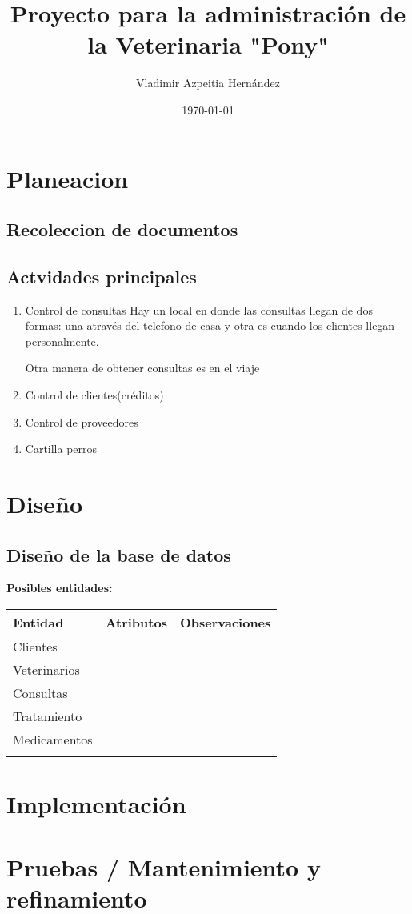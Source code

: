 \documentclass[11pt]{article}
\author{Vladimir Azpeitia Hernández}
\date{\today}
\title{Proyecto para la administración de la Veterinaria "Pony"}
\begin{document}
\maketitle
\section{Planeacion}
\label{sec:orgf28371c}
\subsection{Recoleccion de documentos}
\label{sec:orgb1537d7}
\subsection{Actvidades principales}
\label{sec:org1c1d314}
\begin{enumerate}
\item Control de consultas
Hay un local en donde las consultas llegan de dos formas: una através del telefono de casa y otra es cuando los
clientes llegan personalmente.

Otra manera de obtener consultas es en el viaje
\item Control de clientes(créditos)
\item Control de proveedores
\item Cartilla perros
\end{enumerate}
\section{Diseño}
\label{sec:org6a66c79}
\subsection{Diseño de la base de datos}
\label{sec:orgbf20072}
\textbf{Posibles entidades:} \\
\begin{center}
\begin{tabular}{lll}
Entidad & Atributos & Observaciones\\
\hline
Clientes &  & \\
Veterinarios &  & \\
Consultas &  & \\
Tratamiento &  & \\
Medicamentos &  & \\
 &  & \\
\end{tabular}
\end{center}

\section{Implementación}
\label{sec:orgeaa4d4f}
\section{Pruebas / Mantenimiento y refinamiento}
\label{sec:orgd3b6180}
\end{document}
